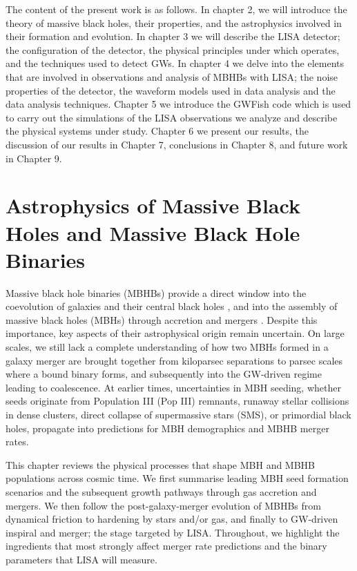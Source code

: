 \documentclass[a4paper,12pt]{article}
\begin{document}
The content of the present work is as follows. In chapter 2, we will introduce the theory of massive black holes, their properties, and the astrophysics involved in their formation and evolution. In chapter 3 we will describe the LISA detector; the configuration of the detector, the physical principles under which operates, and the techniques used to detect GWs. In chapter 4 we delve into the elements that are involved in observations and analysis of MBHBs with LISA; the noise properties of the detector, the waveform models used in data analysis and the data analysis techniques. Chapter 5 we introduce the GWFish code which is used to carry out the simulations of the LISA observations we analyze and describe the physical systems under study. Chapter 6 we present our results, the discussion of our results in Chapter 7, conclusions in Chapter 8, and future work in Chapter 9. 

\section{Astrophysics of Massive Black Holes and Massive Black Hole Binaries}
\label{sec:MBHBTheoObs}

Massive black hole binaries (MBHBs) provide a direct window into the coevolution of galaxies and their central black holes \cite{kormendy2013coevolution}, and into the assembly of massive black holes (MBHs) through accretion and mergers \cite{volonteri2010formation}. Despite this importance, key aspects of their astrophysical origin remain uncertain\cite{volonteri2021origins,klein2016science,barausse2023implications}. On large scales, we still lack a complete understanding of how two MBHs formed in a galaxy merger are brought together from kiloparsec separations to parsec scales where a bound binary forms, and subsequently into the GW-driven regime leading to coalescence\cite{colpi2014massive}. At earlier times, uncertainties in MBH seeding, whether seeds originate from Population III (Pop III) remnants, runaway stellar collisions in dense clusters, direct collapse of supermassive stars (SMS), or primordial black holes, propagate into predictions for MBH demographics and MBHB merger rates\cite{volonteri2021origins,klein2016science,barausse2023implications}.

This chapter reviews the physical processes that shape MBH and MBHB populations across cosmic time. We first summarise leading MBH seed formation scenarios and the subsequent growth pathways through gas accretion and mergers. We then follow the post-galaxy-merger evolution of MBHBs from dynamical friction to hardening by stars and/or gas, and finally to GW-driven inspiral and merger; the stage targeted by LISA. Throughout, we highlight the ingredients that most strongly affect merger rate predictions and the binary parameters that LISA will measure.
\end{document}
